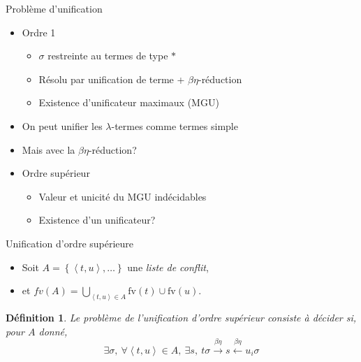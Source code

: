\documentclass{beamer}
\newtheorem{mydefinition}{Définition}
\begin{document}
\begin{frame}{Problème d'unification}
    \begin{itemize}
        \item Ordre 1
        \begin{itemize}
            \item $\sigma$ restreinte au termes de type $*$
            \item Résolu par unification de terme + $\beta \eta$-réduction
            \item Existence d'unificateur maximaux (MGU)
        \end{itemize}
        \item On peut unifier les $\lambda$-termes comme termes simple
        \item Mais avec la $\beta \eta$-réduction?
        \item Ordre supérieur
        \begin{itemize}
            \item Valeur et unicité du MGU indécidables
            \item Existence d'un unificateur?
        \end{itemize}
    \end{itemize}
\end{frame}


\begin{frame}{Unification d'ordre supérieure}
\begin{itemize}
    \item Soit $A = \left\{ \left< t, u \right>,\dots \right\}$ 
        une \emph{liste de conflit},
    \item et $fv(A) = \bigcup\limits_{\left< t, u \right> \in A} \text{fv}(t) \cup \text{fv}(u)$.
\end{itemize}

\begin{mydefinition}
    Le problème de \emph{l'unification d'ordre supérieur} consiste à décider si, pour $A$ donné,
$$\exists \sigma, \ \forall \left< t, u \right> \in A, \ \exists s, \ t \sigma \xrightarrow{\beta \eta} s \xleftarrow{\beta \eta} u_i \sigma $$
\end{mydefinition}
\end{frame}
\end{document}
